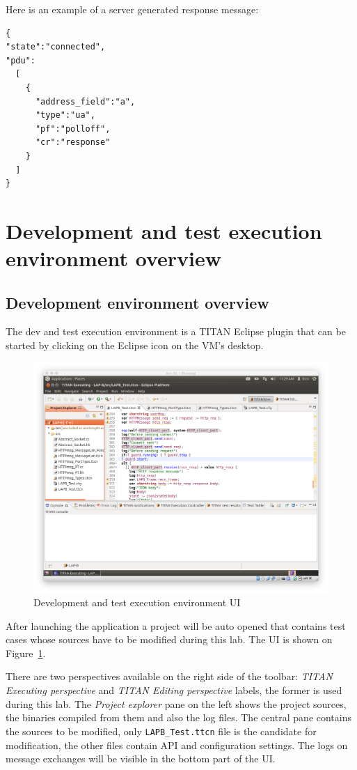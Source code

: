 \documentclass[a4paper]{article}
\begin{document}
Here is an example of a server generated response message:
\begin{verbatim}
{
"state":"connected",
"pdu":
  [
    {
      "address_field":"a",
      "type":"ua",
      "pf":"polloff",
      "cr":"response"
    }
  ]
}
\end{verbatim}

\section{Development and test execution environment overview}

\subsection{Development environment overview}

The dev and test execution environment is a TITAN Eclipse plugin that can be started by clicking on the Eclipse icon on
the VM's desktop.

\begin{figure}[H]
    \centering
    \includegraphics[width=\textwidth]{figures/eclipse.png}
    \caption{Development and test execution environment UI}
    \label{fig:eclipse}
\end{figure}

After launching the application a project will be auto opened that contains test cases whose sources have to be
modified during this lab. The UI is shown on Figure~\ref{fig:eclipse}.

There are two perspectives available on the right side of the toolbar:
\textit{TITAN Executing perspective} and \textit{TITAN Editing perspective} labels, the former is used during this lab.
The \textit{Project explorer} pane on the left shows the project sources, the binaries compiled from them and also the
log files. The central pane contains the sources to be modified, only \verb!LAPB_Test.ttcn! file is the
candidate for modification, the other files contain API and configuration settings.
The logs on message exchanges will be visible in the bottom part of the UI.
\end{document}
